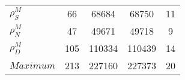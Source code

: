 \begin{center}
\begin{longtable}{lcccc}
$ {\rho^{M}_{S}}       $	 & 	                   66	 & 	                68684	 & 	                68750	 & 	                   11 \\ 
$ {\rho^{M}_{N}}       $	 & 	                   47	 & 	                49671	 & 	                49718	 & 	                    9 \\ 
$ {\rho^{M}_{D}}       $	 & 	                  105	 & 	               110334	 & 	               110439	 & 	                   14 \\ 
$Maximum               $	 & 	                  213	 & 	               227160	 & 	               227373	 & 	                   20 \\ 
\end{longtable}
 \end{center}
